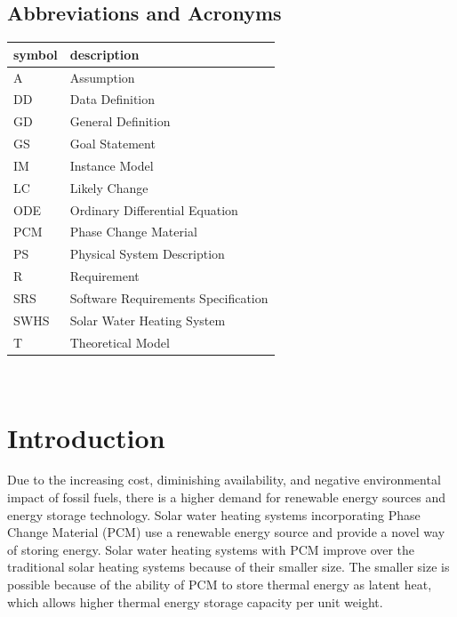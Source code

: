 \documentclass[12pt]{article}
\newcommand{\blt}{- } %
\newcommand{\progname}{SWHS}
\begin{document}


\subsection{Abbreviations and Acronyms}

\renewcommand{\arraystretch}{1.2}
\begin{tabular}{l l} 
  \toprule		
  \textbf{symbol} & \textbf{description}\\
  \midrule 
  A & Assumption\\
  DD & Data Definition\\
  GD & General Definition\\
  GS & Goal Statement\\
  IM & Instance Model\\
  LC & Likely Change\\
  ODE & Ordinary Differential Equation\\
  PCM & Phase Change Material\\
  PS & Physical System Description\\
  R & Requirement\\
  SRS & Software Requirements Specification\\
  \progname{} & Solar Water Heating System\\
  T & Theoretical Model\\
  \bottomrule
\end{tabular}\\

\section{Introduction}

Due to the increasing cost, diminishing availability, and negative environmental
impact of fossil fuels, there is a higher demand for renewable energy sources
and energy storage technology.  Solar water heating systems incorporating Phase
Change Material (PCM) use a renewable energy source and provide a novel way of
storing energy.  Solar water heating systems with PCM improve over the
traditional solar heating systems because of their smaller size.  The smaller
size is possible because of the ability of PCM to store thermal energy as latent
heat, which allows higher thermal energy storage capacity per unit weight.
\end{document}
